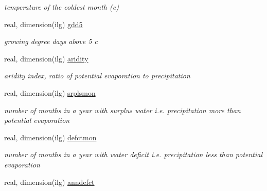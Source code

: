 \begin{DoxyCompactItemize}
\begin{DoxyCompactList}\small\item\em temperature of the coldest month (c) \end{DoxyCompactList}\item 
\hypertarget{structctem__statevars_1_1veg__gat_a578da032a318a0184163c790e39928db}{}real, dimension(ilg) \hyperlink{structctem__statevars_1_1veg__gat_a578da032a318a0184163c790e39928db}{gdd5}\label{structctem__statevars_1_1veg__gat_a578da032a318a0184163c790e39928db}

\begin{DoxyCompactList}\small\item\em growing degree days above 5 c \end{DoxyCompactList}\item 
\hypertarget{structctem__statevars_1_1veg__gat_a3064e8f4582102977b4baea40e02b404}{}real, dimension(ilg) \hyperlink{structctem__statevars_1_1veg__gat_a3064e8f4582102977b4baea40e02b404}{aridity}\label{structctem__statevars_1_1veg__gat_a3064e8f4582102977b4baea40e02b404}

\begin{DoxyCompactList}\small\item\em aridity index, ratio of potential evaporation to precipitation \end{DoxyCompactList}\item 
\hypertarget{structctem__statevars_1_1veg__gat_a1240848293f77458712ea3692a27a6d9}{}real, dimension(ilg) \hyperlink{structctem__statevars_1_1veg__gat_a1240848293f77458712ea3692a27a6d9}{srplsmon}\label{structctem__statevars_1_1veg__gat_a1240848293f77458712ea3692a27a6d9}

\begin{DoxyCompactList}\small\item\em number of months in a year with surplus water i.\+e. precipitation more than potential evaporation \end{DoxyCompactList}\item 
\hypertarget{structctem__statevars_1_1veg__gat_a36f851ca400c9b78f44b675d732a8160}{}real, dimension(ilg) \hyperlink{structctem__statevars_1_1veg__gat_a36f851ca400c9b78f44b675d732a8160}{defctmon}\label{structctem__statevars_1_1veg__gat_a36f851ca400c9b78f44b675d732a8160}

\begin{DoxyCompactList}\small\item\em number of months in a year with water deficit i.\+e. precipitation less than potential evaporation \end{DoxyCompactList}\item 
\hypertarget{structctem__statevars_1_1veg__gat_a1e53f6a1f8f9c68b1e164b30fe833c52}{}real, dimension(ilg) \hyperlink{structctem__statevars_1_1veg__gat_a1e53f6a1f8f9c68b1e164b30fe833c52}{anndefct}\label{structctem__statevars_1_1veg__gat_a1e53f6a1f8f9c68b1e164b30fe833c52}


\end{DoxyCompactItemize}
